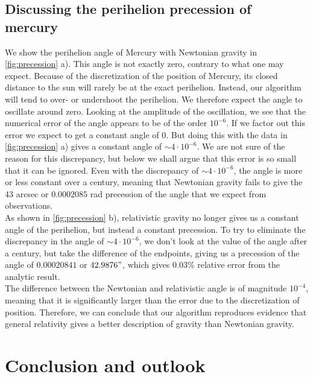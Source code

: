\documentclass[a4paper, 10pt]{article}
\begin{document}
\subsection{Discussing the perihelion precession of mercury}
We show the perihelion angle of Mercury with Newtonian gravity in \cref{fig:precession} a). This angle is not exactly zero, contrary to what one may expect. Because of the discretization of the position of Mercury, its closed distance to the sun will rarely be at the exact perihelion. Instead, our algorithm will tend to over- or undershoot the perihelion. We therefore expect the angle to oscillate around zero. Looking at the amplitude of the oscillation,  we see that the numerical error of the angle appears to be of the order $10^{-6}$. If we factor out this error we expect to get a constant angle of 0. But doing this with the data in \cref{fig:precession} a) gives a constant angle of $\sim 4 \cdot 10^{-6}$. We are not sure of the reason for this discrepancy, but below we shall argue that this error is so small that it can be ignored. Even with the discrepancy of $\sim 4 \cdot 10^{-6}$, the angle is more or less constant over a century, meaning that Newtonian gravity fails to give the 43 arcsec or $0.0002085$ rad precession of the angle that we expect from observations.\\
\linebreak
As shown in \cref{fig:precession} b), relativistic gravity no longer gives us a constant angle of the perihelion, but instead a constant precession. To try to eliminate the discrepancy in the angle of $\sim 4 \cdot 10^{-6}$, we don't look at the value of the angle after a century, but take the difference of the endpoints, giving us a precession of the angle of $0.00020841$ or $42.9876"$, which gives $0.03\%$ relative error from the analytic result. \\
\linebreak
The difference between the Newtonian and relativistic angle is of magnitude $10^{-4}$, meaning that it is significantly larger than the error due to the discretization of position. Therefore, we can conclude that our algorithm reproduces evidence that general relativity gives a better description of gravity than Newtonian gravity.
\newpage
\section{Conclusion and outlook}
\end{document}

